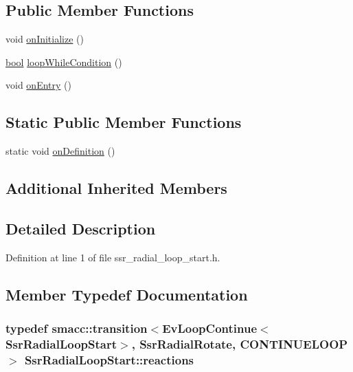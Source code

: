 \subsection*{Public Member Functions}
\begin{DoxyCompactItemize}
\item 
void \hyperlink{structSsrRadialLoopStart_a6e90d6a71746c5ddfa1991ca7b1c444b}{on\+Initialize} ()
\item 
\hyperlink{classbool}{bool} \hyperlink{structSsrRadialLoopStart_a599d824a2659e000fa3a81cbead2ef96}{loop\+While\+Condition} ()
\item 
void \hyperlink{structSsrRadialLoopStart_a59c7aae696fe4cdce9d9413c7a50989c}{on\+Entry} ()
\end{DoxyCompactItemize}
\subsection*{Static Public Member Functions}
\begin{DoxyCompactItemize}
\item 
static void \hyperlink{structSsrRadialLoopStart_a8e30c232eec6435f6cc29befe1006c65}{on\+Definition} ()
\end{DoxyCompactItemize}
\subsection*{Additional Inherited Members}


\subsection{Detailed Description}


Definition at line 1 of file ssr\+\_\+radial\+\_\+loop\+\_\+start.\+h.



\subsection{Member Typedef Documentation}
\subsubsection[{\texorpdfstring{reactions}{reactions}}]{\setlength{\rightskip}{0pt plus 5cm}typedef {\bf smacc\+::transition}$<$Ev\+Loop\+Continue$<${\bf Ssr\+Radial\+Loop\+Start}$>$, {\bf Ssr\+Radial\+Rotate}, C\+O\+N\+T\+I\+N\+U\+E\+L\+O\+OP$>$ {\bf Ssr\+Radial\+Loop\+Start\+::reactions}}\hypertarget{structSsrRadialLoopStart_a182ebeeec9ed788811d32ad023e13269}{}\label{structSsrRadialLoopStart_a182ebeeec9ed788811d32ad023e13269}


